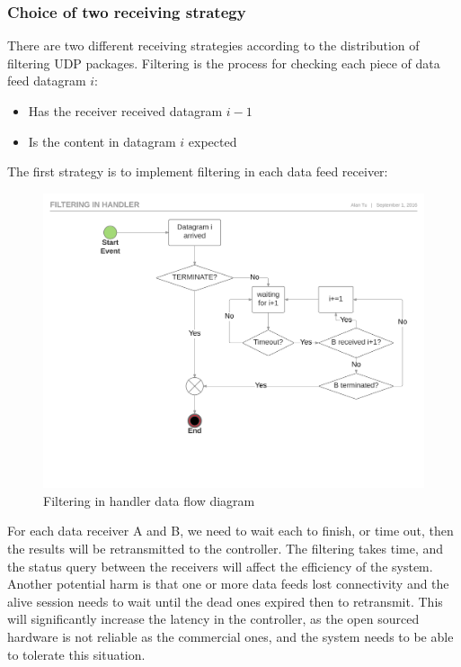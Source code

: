 \documentclass[11pt,openright,a4paper]{report}
\begin{document}
\subsubsection{Choice of two receiving strategy}
There are two different receiving strategies according to the distribution of filtering UDP packages. Filtering is the process for checking each piece of data feed datagram $i$: 
\begin{itemize}
	\item Has the receiver received datagram $i-1$
	\item Is the content in datagram $i$ expected
\end{itemize}
The first strategy is to implement filtering in each data feed receiver:
\begin{figure}[H]
\centering
\includegraphics[width=1.0\linewidth]{"picture/Filtering in handler - Page 1"}
\caption{Filtering in handler data flow diagram}
\label{fig:Filteringinhandler-Page1}
\end{figure}
For each data receiver A and B, we need to wait each to finish, or time out, then the results will be retransmitted to the controller. The filtering takes time, and the status query between the receivers will affect the efficiency of the system. Another potential harm is that one or more data feeds lost connectivity and the alive session needs to wait until the dead ones expired then to retransmit. This will significantly increase the latency in the controller, as the open sourced hardware is not reliable as the commercial ones, and the system needs to be able to tolerate this situation.\\
\end{document}
